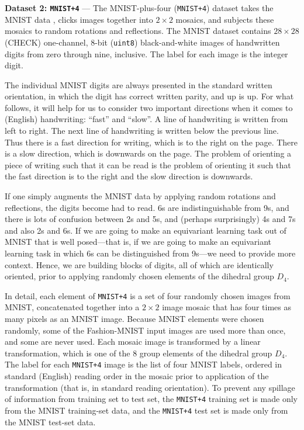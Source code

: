 \documentclass{article}
\renewcommand{\paragraph}[1]{\par\medskip\noindent\textbf{#1} ---}
\begin{document}
\paragraph{Dataset 2: \texttt{MNIST+4}}
The MNIST-plus-four (\texttt{MNIST+4}) dataset takes the MNIST data \cite{mnist}, clicks images together into $2\times 2$ mosaics, and subjects these mosaics to random rotations and reflections.
The MNIST dataset contains $28\times 28$ (CHECK) one-channel, 8-bit (\texttt{uint8}) black-and-white images of handwritten digits from zero through nine, inclusive.
The label for each image is the integer digit.

The individual MNIST digits are always presented in the standard written orientation, in which the digit has correct written parity, and up is up.
For what follows, it will help for us to consider two important directions when it comes to (English) handwriting: ``fast'' and ``slow''.
A line of handwriting is written from left to right.
The next line of handwriting is written below the previous line.
Thus there is a fast direction for writing, which is to the right on the page.
There is a slow direction, which is downwards on the page.
The problem of orienting a piece of writing such that it can be read is the problem of orienting it such that the fast direction is to the right and the slow direction is downwards.

If one simply augments the MNIST data by applying random rotations and reflections, the digits become had to read. 6s are indistinguishable from 9s, and there is lots of confusion between 2s and 5s, and (perhaps surprisingly) 4s and 7s and also 2s and 6s.
If we are going to make an equivariant learning task out of MNIST that is well posed---that is, if we are going to make an equivariant learning task in which 6s can be distinguished from 9s---we need to provide more context.
Hence, we are building blocks of digits, all of which are identically oriented, prior to applying randomly chosen elements of the dihedral group $D_4$.

In detail, each element of \texttt{MNIST+4} is a set of four randomly chosen images from MNIST, concatenated together into a $2\times2$ image mosaic that has four times as many pixels as an MNIST image.
Because MNIST elements were chosen randomly, some of the Fashion-MNIST input images are used more than once, and some are never used.
Each mosaic image is transformed by a linear transformation, which is one of the 8 group elements of the dihedral group $D_4$.
The label for each \texttt{MNIST+4} image is the list of four MNIST labels, ordered in standard (English) reading order in the mosaic prior to application of the transformation (that is, in standard reading orientation).
To prevent any spillage of information from training set to test set, the \texttt{MNIST+4} training set is made only from the MNIST training-set data, and the \texttt{MNIST+4} test set is made only from the MNIST test-set data. 
\end{document}
